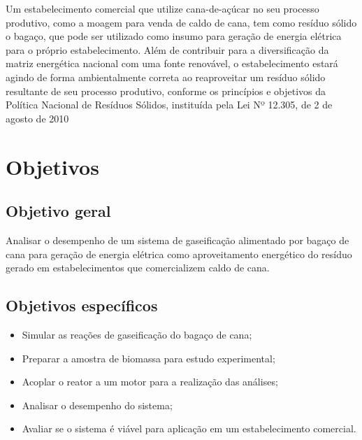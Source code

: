 Um estabelecimento comercial que utilize cana-de-açúcar no seu processo produtivo, como a moagem para venda de caldo de cana, tem como resíduo sólido o bagaço, que pode ser utilizado como insumo para geração de energia elétrica para o próprio estabelecimento.  Além de contribuir para a diversificação da matriz energética nacional com uma fonte renovável, o estabelecimento estará agindo de forma ambientalmente correta ao reaproveitar um resíduo sólido resultante de seu processo produtivo, conforme os princípios e objetivos da Política Nacional de Resíduos Sólidos, instituída pela Lei Nº 12.305, de 2 de agosto de 2010 %

\section{Objetivos}
\subsection{Objetivo geral}
Analisar o desempenho de um sistema de gaseificação alimentado por bagaço de cana para geração de energia elétrica como aproveitamento energético do resíduo gerado em estabelecimentos que comercializem caldo de cana.

\subsection{Objetivos específicos}
\begin{itemize}
\item Simular as reações de gaseificação do bagaço de cana;

\item Preparar a amostra de biomassa para estudo experimental;

\item Acoplar o reator a um motor para a realização das análises;

\item Analisar o desempenho do sistema;

\item Avaliar se o sistema é viável para aplicação em um estabelecimento comercial.
\end{itemize}




